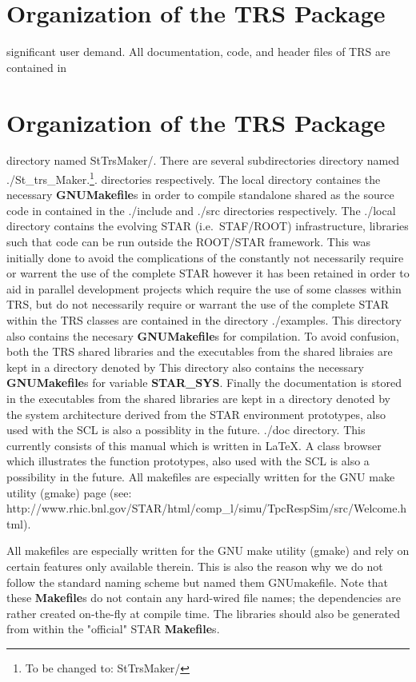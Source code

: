 \documentclass[twoside]{article}
\newcommand{\name}[1]{\textsf{#1}}%
\begin{document}
\section{Organization of the TRS Package}
significant user demand.  
All documentation, code, and header files of TRS are contained in
\section{Organization of the \name{TRS} Package}

directory named \name{StTrsMaker/}.  There are several subdirectories
directory named \name{./St_trs_Maker}.\footnote{To be changed to: 
        \name{StTrsMaker/}}.  
directories respectively.  The \name{local} directory containes the
necessary {\bf GNUMakefile}s in order to compile standalone shared
as the source code in contained in the \name{./include} and \name{./src}
directories respectively.  The \name{./local} directory contains the
evolving STAR (i.e.~STAF/ROOT)   infrastructure,
libraries such that code can be run outside the ROOT/STAR framework.
This was initially done to avoid the complications of the constantly
not necessarily require or warrent the use of the complete STAR 
however it has been retained in order to aid in parallel development
projects which require the use of some classes within \name{TRS}, but do
not necessarily require or warrant the use of the complete STAR 
within the TRS classes are contained in the directory \name{./examples}.
This directory also contains the necesary {\bf GNUMakefile}s for 
compilation.  To avoid confusion, both the TRS shared libraries and the
executables from the shared libraies are kept in a directory denoted by
This directory also contains the necessary {\bf GNUMakefile}s for 
variable {\bf STAR\_SYS}.  Finally the documentation is stored in the
executables from the shared libraries are kept in a directory denoted by
the system architecture derived from the STAR environment
prototypes, also used with the SCL is also a possiblity in the future.
\name{./doc} directory.  This currently consists of this manual which
is written in \LaTeX.  A class browser which illustrates the function
prototypes, also used with the SCL is also a possibility in the future.
All makefiles are especially written for the GNU make utility (gmake) 
page (see: http://www.rhic.bnl.gov/STAR/html/comp\_l/simu/TpcRespSim/src/Welcome.html).

All makefiles are especially written for the \name{GNU} make utility (gmake) 
and rely on
certain features only available therein. This is also the reason why we do not
follow the standard naming scheme but named them \name{GNUmakefile}. 
Note that these {\bf Makefile}s do not contain any hard-wired file names;
the dependencies are rather created on-the-fly at compile time.  The
libraries should also be generated from within the "official" STAR
{\bf Makefile}s.
\end{document}
